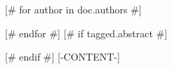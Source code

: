 [# for author in doc.authors #]
\author{[- author.name -]}
[# endfor #]
[# if tagged.abstract #]
\begin{abstract}
[-tagged.abstract-]
\end{abstract}
[# endif #]
[-CONTENT-]